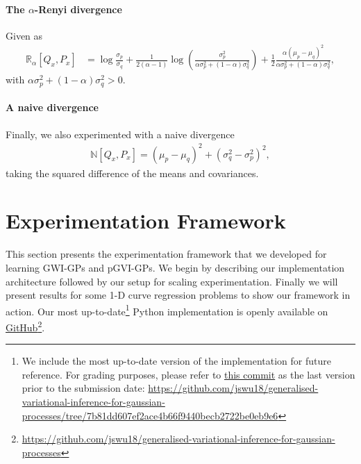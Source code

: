 \documentclass{article}
\numberwithin{equation}{section}
\begin{document}
\paragraph{The $\alpha$-Renyi divergence} Given as
\begin{align}
    \mathbb{R}_\alpha \left[Q_{x}, P_{x}\right] &= \log\frac{\sigma_p}{\sigma_q} + \frac{1}{2(\alpha-1)}\log\left(\frac{\sigma_p^2}{\alpha \sigma_p^2 + (1-\alpha) \sigma_q^2}\right)  + \frac{1}{2}\frac{\alpha \left(\mu_p - \mu_q\right)^2}{\alpha \sigma_p^2 + (1-\alpha) \sigma_q^2},
\end{align}
with $\alpha \sigma_p^2 + (1-\alpha) \sigma_q^2 > 0$.
\paragraph{A naive divergence}Finally, we also experimented with a naive divergence
\begin{align}
    \mathbb{N} \left[Q_{x}, P_{x}\right] = \left(\mu_p - \mu_q\right)^2 + \left(\sigma_q^2-\sigma_p^2\right)^2,
\end{align}
taking the squared difference of the means and covariances.

\newpage
\section{Experimentation Framework}\label{section:experimentation-framework}
This section presents the experimentation framework that we developed for learning GWI-GPs and pGVI-GPs.
We begin by describing our implementation architecture followed by our setup for scaling experimentation.
Finally we will present results for some 1-D curve regression problems to show our framework in action.
Our most up-to-date\footnote{We include the most up-to-date version of the implementation for future reference. For grading purposes, please refer to \href{https://github.com/jswu18/generalised-variational-inference-for-gaussian-processes/tree/7b81dd607ef2ace4b66f9440becb2722be0eb9e6}{this commit} as the last version prior to the submission date: \href{https://github.com/jswu18/generalised-variational-inference-for-gaussian-processes/tree/7b81dd607ef2ace4b66f9440becb2722be0eb9e6}{https://github.com/jswu18/generalised-variational-inference-for-gaussian-processes/tree/7b81dd607ef2ace4b66f9440becb2722be0eb9e6}} Python implementation is openly available on \href{https://github.com/jswu18/generalised-variational-inference-for-gaussian-processes}{GitHub}\footnote{\href{https://github.com/jswu18/generalised-variational-inference-for-gaussian-processes}{https://github.com/jswu18/generalised-variational-inference-for-gaussian-processes}}.
\end{document}

